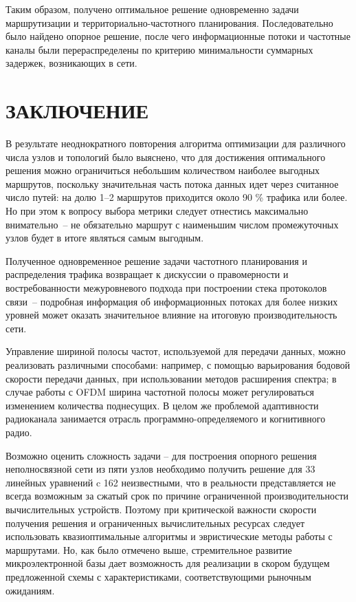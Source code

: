 \documentclass[14pt,a4paper,titlepage]{extarticle}
\newcommand{\nnumsection}[1]{%
	\clearpage
	\addcontentsline{toc}{section}{#1}
	\section*{#1}
}
\begin{document}
Таким образом, получено оптимальное решение одновременно задачи маршрутизации и территориально-частотного планирования. Последовательно было найдено опорное решение, после чего информационные потоки и частотные каналы были перераспределены по критерию минимальности суммарных задержек, возникающих в сети.
\nnumsection{ЗАКЛЮЧЕНИЕ}
В результате неоднократного повторения алгоритма оптимизации для различного числа узлов и топологий было выяснено, что для достижения оптимального решения можно ограничиться небольшим количеством наиболее выгодных маршрутов, поскольку значительная часть потока данных идет через считанное число путей: на долю 1--2 маршрутов приходится около 90 \% трафика или более. Но при этом к вопросу выбора метрики следует отнестись максимально внимательно~-- не обязательно маршрут с наименьшим числом промежуточных узлов будет в итоге являться самым выгодным.

Полученное одновременное решение задачи частотного планирования и распределения трафика возвращает к дискуссии о правомерности и востребованности межуровневого подхода при построении стека протоколов связи~-- подробная информация об информационных потоках для более низких уровней может оказать значительное влияние на итоговую производительность сети. 

Управление шириной полосы частот, используемой для передачи данных, можно реализовать различными способами: например, с помощью варьирования бодовой скорости передачи данных, при использовании методов расширения спектра; в случае работы с OFDM ширина частотной полосы может регулироваться изменением количества поднесущих. В целом же проблемой адаптивности радиоканала занимается отрасль программно-определяемого и когнитивного радио.

Возможно оценить сложность задачи -- для построения опорного решения неполносвязной сети из пяти узлов необходимо получить решение для 33 линейных уравнений c 162 неизвестными, что в реальности представляется не всегда возможным за сжатый срок по причине ограниченной производительности вычислительных устройств. Поэтому при критической важности скорости получения решения и ограниченных вычислительных ресурсах следует использовать квазиоптимальные алгоритмы и эвристические методы работы с маршрутами. Но, как было отмечено выше, стремительное развитие микроэлектронной базы дает возможность для реализации в скором будущем предложенной схемы с характеристиками, соответствующими рыночным ожиданиям.
\end{document}
